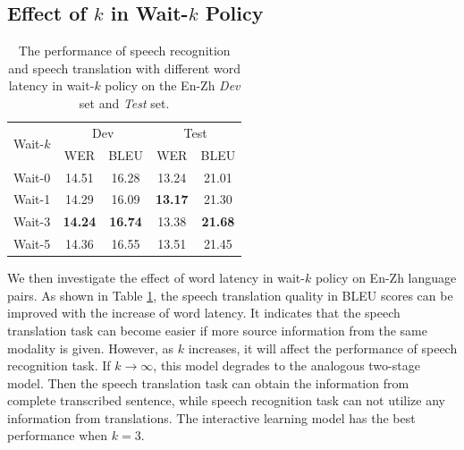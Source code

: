 \documentclass[letterpaper]{article} %
\begin{document}
\subsection{Effect of $k$ in Wait-$k$ Policy}
\label{sec:k}
\begin{table}[t]
	\centering
	\begin{tabular}{@{}l|cc|cc@{}}
		\hline
		\multirow{2}{*}{Wait-$k$} & \multicolumn{2}{c|}{Dev} & \multicolumn{2}{c}{Test} \\
		\multicolumn{1}{c|}{}              & WER      & BLEU     & WER      & BLEU     \\
		\hline
		Wait-0                                        & 14.51        & 16.28       & 13.24       & 21.01       \\
		Wait-1                                         & 14.29       & 16.09       & \textbf{13.17}       & 21.30       \\
		Wait-3                                        & \textbf{14.24}      &  \textbf{16.74}       & 13.38       & \textbf{21.68}       \\
		Wait-5                                        & 14.36       &  16.55      & 13.51       & 21.45     \\
		\hline
	\end{tabular}
	\caption{The performance of speech recognition and speech translation with different word latency in wait-$k$ policy on the En-Zh \textit{Dev} set and \textit{Test} set.}
	\label{tbl:wait-k}
\end{table}

We then investigate the effect of word latency in wait-$k$ policy on En-Zh language pairs. As shown in Table \ref{tbl:wait-k}, the speech translation quality in BLEU scores can be improved with the increase of word latency. It indicates that the speech translation task can become easier if more source information from the same modality is given. However, as $k$ increases, it will affect the performance of speech recognition task.
If $k \rightarrow \infty$,  this model degrades to the analogous two-stage model. Then the speech translation task can obtain the information from complete transcribed sentence, while speech recognition task can not utilize any information from translations. %
The interactive learning model has the best performance when $k=3$.  %
\end{document}
